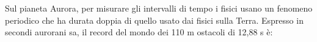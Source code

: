 Sul pianeta Aurora, per misurare gli intervalli di tempo i
fisici usano un fenomeno periodico che ha durata doppia di 
quello usato dai fisici sulla Terra. 
Espresso in secondi aurorani sa, il record del mondo dei 
110 m ostacoli di 12,88 s è:
